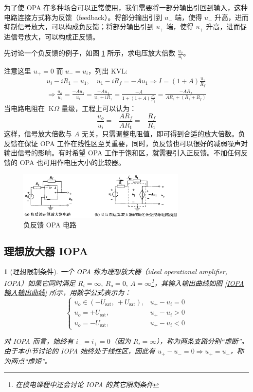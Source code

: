 \documentclass[UTF8]{report}
\def\kO{\ \mathrm{K}\Omega}
\theoremstyle{MyLineTheoremStyle} %
\theoremstyle{MyBlockTheoremStyle} %
\theoremstyle{MySubsubsectionStyle} %
\newtheorem{definition}{}
\begin{document}
为了使 OPA 在多种场合可以正常使用，我们需要将一部分输出引回到输入，这种电路连接方式称为反馈（feedback）。将部分输出引到 $u_-$ 端，使得 $u_-$ 升高，进而抑制信号放大，可以构成负反馈；将部分输出引到 $u_+$ 端，使得 $u_+$ 升高，进而促进信号放大，可以构成正反馈。


先讨论一个负反馈的例子，如图 \ref{负反馈 OPA 电路} 所示，求电压放大倍数 $\frac{u_o}{u_i}$。

注意这里 $u_+ = 0$ 而 $u_- = u_i$，列出 KVL: 
\begin{gather}
u_i - iR_1 = u_1,\quad u_1 - iR_f = -Au_1 \Longrightarrow I =(1+A) \frac{u_1}{R_f} \\ 
\Longrightarrow \frac{u_o}{u_i} = \frac{-Au_1}{u_i} = \frac{-Au_1}{u_1+iR_1} = \frac{-A}{1+(1+A)\frac{R_1}{R_f}} = \frac{-AR_f}{AR_1 + (R_1 + R_f)}
\end{gather}
当电路电阻在 $\kO$ 量级，工程上可以认为：
\begin{equation}
\frac{u_o}{u_i} = -\frac{AR_f}{AR_1} = -\frac{R_f}{R_1}
\end{equation}
这样，信号放大倍数与 $A$ 无关，只需调整电阻值，即可得到合适的放大倍数。负反馈在保证 OPA 工作在线性区至关重要，同时，负反馈也可以很好的减弱噪声对输出信号的影响。有时希望 OPA 工作于饱和区，就需要引入正反馈。不加任何反馈的 OPA 也可用作电压大小的比较器。

\begin{figure}[H]\centering
\includegraphics[width=0.75\textwidth]{assets/1,2/image (51).png}
\caption{负反馈 OPA 电路}\label{负反馈 OPA 电路}
\end{figure}


\subsection{理想放大器 IOPA}

\begin{definition}[理想限制条件]
一个 OPA 称为理想放大器（ideal operational amplifier, IOPA）如果它同时满足 $R_i = \infty,\ R_o = 0,\ A = \infty$\footnote{在模电课程中还会讨论 IOPA 的其它限制条件}，其输入输出曲线如图 \ref{IOPA 输入输出曲线} 所示，用数学公式表示为：
\begin{equation}
\begin{cases}
    u_o \in (-U_{\text{sat}},\ +U_{\text{sat}}), &u_+ - u_i = 0 \\
    u_o = +U_{\text{sat}}, &u_+ - u_i > 0 \\
    u_o = -U_{\text{sat}}, &u_+ - u_i < 0 
\end{cases}
\end{equation}

对 IOPA 而言，始终有 $i_- = i_+ = 0$（因为 $R_i = \infty$），称为两条支路分别“虚断”。由于本小节讨论的 IOPA 始终处于线性区，因此有 $u_+ - u_- = 0 \Longrightarrow u_+ = u_- $，称为两点“虚短”。
\end{definition}
\end{document}
